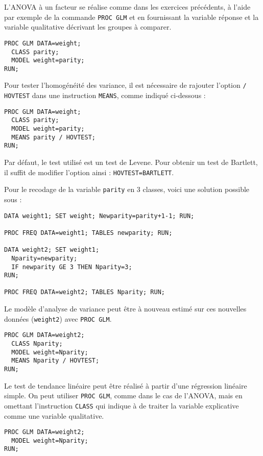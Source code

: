 L'ANOVA à un facteur se réalise comme dans les exercices précédents, à
l'aide par exemple de la commande \texttt{PROC GLM} et en fournissant la
variable réponse et la variable qualitative décrivant les groupes à
comparer.
\begin{verbatim}
PROC GLM DATA=weight; 
  CLASS parity; 
  MODEL weight=parity; 
RUN;
\end{verbatim}

Pour tester l'homogénéité des variance, il est nécessaire de rajouter
l'option \verb|/ HOVTEST| dans une instruction \texttt{MEANS}, comme indiqué
ci-dessous :
\begin{verbatim}
PROC GLM DATA=weight; 
  CLASS parity; 
  MODEL weight=parity;
  MEANS parity / HOVTEST;
RUN;
\end{verbatim}
Par défaut, le test utilisé est un test de Levene. Pour obtenir un test de
Bartlett, il suffit de modifier l'option ainsi : \verb|HOVTEST=BARTLETT|.

Pour le recodage de la variable \texttt{parity} en 3 classes, voici une
solution possible sous \SAS :
\begin{verbatim}
DATA weight1; SET weight; Newparity=parity+1-1; RUN;

PROC FREQ DATA=weight1; TABLES newparity; RUN;

DATA weight2; SET weight1;
  Nparity=newparity; 
  IF newparity GE 3 THEN Nparity=3;
RUN;

PROC FREQ DATA=weight2; TABLES Nparity; RUN;
\end{verbatim}

Le modèle d'analyse de variance peut être à nouveau estimé sur ces nouvelles
données (\texttt{weight2}) avec \texttt{PROC GLM}.
\begin{verbatim}
PROC GLM DATA=weight2; 
  CLASS Nparity; 
  MODEL weight=Nparity;
  MEANS Nparity / HOVTEST;
RUN;
\end{verbatim}

Le test de tendance linéaire peut être réalisé à partir d'une régression
linéaire simple. On peut utiliser \texttt{PROC GLM}, comme dans le cas de
l'ANOVA, mais en omettant l'instruction \texttt{CLASS} qui indique à \SAS de
traiter la variable explicative comme une variable qualitative.
\begin{verbatim}
PROC GLM DATA=weight2;  
  MODEL weight=Nparity;
RUN;
\end{verbatim}